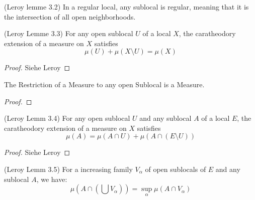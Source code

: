 \begin{lemma}
(Leroy lemme 3.2)
    \label{lem:regularity_of_sublocals}
    \leanok
    In a regular local, any sublocal is regular, meaning that it is the intersection of all open neighborhoods.
\end{lemma}


\begin{lemma}
(Leroy Lemme 3.3)
    \label{lem:measure_add_compl_eq_top}
    \leanok
    For any open sublocal $U$ of a local $X$, the caratheodory extension of a measure on $X$ satisfies \[\mu(U) + \mu(X \setminus U) = \mu(X)\]
\end{lemma}
\begin{proof}
    \leanok
    Siehe Leroy
\end{proof}



\begin{lemma}[Restriction]
    The Restriction of a Measure to any open Sublocal is a Measure.
    \label{lem:restriction}
    \leanok
\end{lemma}
\begin{proof}
\leanok
\end{proof}

\begin{lemma}[Property 2]
(Leroy Lemm 3.4)
    \label{lem:restrict_add_compl_eq_top}
    \leanok
    For any open sublocal $U$ and any sublocal $A$ of a local $E$, the caratheodory extension of a measure on $X$ satisfies \[\mu(A) = \mu(A \cap U) + \mu(A \cap(E\setminus U))\]
\end{lemma}
\begin{proof}
    Siehe Leroy
    \leanok
\end{proof}

\begin{lemma}[Property 3]
(Leroy Lemm 3.5)
    \label{lem:restrict_preserves_sSup}
    \leanok
    For a increasing family $V_{\alpha}$ of open sublocals of $E$ and any sublocal $A$, we have:
    \[\mu(A \cap(\bigcup V_{\alpha})) = \sup_\alpha \mu(A\cap V_\alpha)\]
\end{lemma}

